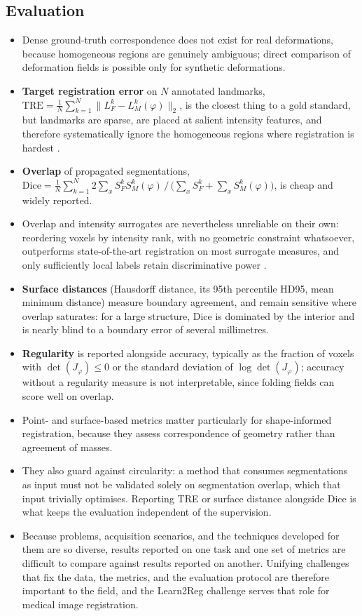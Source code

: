 \subsection{Evaluation}
\label{sec:bg-registration-evaluation}
\begin{itemize}
\item Dense ground-truth correspondence does not exist for real deformations, because homogeneous regions are genuinely ambiguous; direct comparison of deformation fields is possible only for synthetic deformations.
\item \textbf{Target registration error} on $N$ annotated landmarks, $\mathrm{TRE} = \tfrac{1}{N}\sum_{k=1}^{N} \lVert L_F^k - L_M^k(\varphi) \rVert_2$, is the closest thing to a gold standard, but landmarks are sparse, are placed at salient intensity features, and therefore systematically ignore the homogeneous regions where registration is hardest \citep{chen2025survey}.
\item \textbf{Overlap} of propagated segmentations, $\mathrm{Dice} = \tfrac{1}{N}\sum_{k=1}^{N} 2\sum_{x} S_F^k S_M^k(\varphi) \,/\, \big(\sum_{x} S_F^k + \sum_{x} S_M^k(\varphi)\big)$, is cheap and widely reported.
\item Overlap and intensity surrogates are nevertheless unreliable on their own: reordering voxels by intensity rank, with no geometric constraint whatsoever, outperforms state-of-the-art registration on most surrogate measures, and only sufficiently local labels retain discriminative power \citep{rohlfing2011image}.
\item \textbf{Surface distances} (Hausdorff distance, its 95th percentile HD95, mean minimum distance) measure boundary agreement, and remain sensitive where overlap saturates: for a large structure, Dice is dominated by the interior and is nearly blind to a boundary error of several millimetres.
\item \textbf{Regularity} is reported alongside accuracy, typically as the fraction of voxels with $\det(J_\varphi) \leq 0$ or the standard deviation of $\log \det(J_\varphi)$; accuracy without a regularity measure is not interpretable, since folding fields can score well on overlap.
\item Point- and surface-based metrics matter particularly for shape-informed registration, because they assess correspondence of geometry rather than agreement of masses.
\item They also guard against circularity: a method that consumes segmentations as input must not be validated solely on segmentation overlap, which that input trivially optimises. Reporting TRE or surface distance alongside Dice is what keeps the evaluation independent of the supervision.
\item Because problems, acquisition scenarios, and the techniques developed for them are so diverse, results reported on one task and one set of metrics are difficult to compare against results reported on another. Unifying challenges that fix the data, the metrics, and the evaluation protocol are therefore important to the field, and the Learn2Reg challenge \citep{hering2022learn2reg} serves that role for medical image registration.
\end{itemize}


